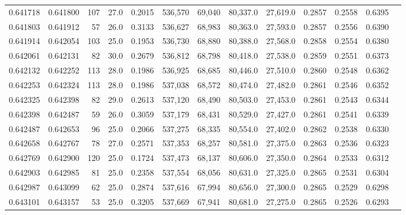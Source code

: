 \begin{tabular}{rrrrrrrrrrrrr}
0.641718 & 0.641800 &   107 & 27.0 &                                     0.2015 & 536,570 &  69,040 &  80,337.0 &  27,619.0 & 0.2857 & 0.2558 & 0.6395 \\
0.641803 & 0.641912 &    57 & 26.0 &                                     0.3133 & 536,627 &  68,983 &  80,363.0 &  27,593.0 & 0.2857 & 0.2556 & 0.6390 \\
0.641914 & 0.642054 &   103 & 25.0 &                                     0.1953 & 536,730 &  68,880 &  80,388.0 &  27,568.0 & 0.2858 & 0.2554 & 0.6380 \\
0.642061 & 0.642131 &    82 & 30.0 &                                     0.2679 & 536,812 &  68,798 &  80,418.0 &  27,538.0 & 0.2859 & 0.2551 & 0.6373 \\
0.642132 & 0.642252 &   113 & 28.0 &                                     0.1986 & 536,925 &  68,685 &  80,446.0 &  27,510.0 & 0.2860 & 0.2548 & 0.6362 \\
0.642253 & 0.642324 &   113 & 28.0 &                                     0.1986 & 537,038 &  68,572 &  80,474.0 &  27,482.0 & 0.2861 & 0.2546 & 0.6352 \\
0.642325 & 0.642398 &    82 & 29.0 &                                     0.2613 & 537,120 &  68,490 &  80,503.0 &  27,453.0 & 0.2861 & 0.2543 & 0.6344 \\
0.642398 & 0.642487 &    59 & 26.0 &                                     0.3059 & 537,179 &  68,431 &  80,529.0 &  27,427.0 & 0.2861 & 0.2541 & 0.6339 \\
0.642487 & 0.642653 &    96 & 25.0 &                                     0.2066 & 537,275 &  68,335 &  80,554.0 &  27,402.0 & 0.2862 & 0.2538 & 0.6330 \\
0.642658 & 0.642767 &    78 & 27.0 &                                     0.2571 & 537,353 &  68,257 &  80,581.0 &  27,375.0 & 0.2863 & 0.2536 & 0.6323 \\
0.642769 & 0.642900 &   120 & 25.0 &                                     0.1724 & 537,473 &  68,137 &  80,606.0 &  27,350.0 & 0.2864 & 0.2533 & 0.6312 \\
0.642903 & 0.642985 &    81 & 25.0 &                                     0.2358 & 537,554 &  68,056 &  80,631.0 &  27,325.0 & 0.2865 & 0.2531 & 0.6304 \\
0.642987 & 0.643099 &    62 & 25.0 &                                     0.2874 & 537,616 &  67,994 &  80,656.0 &  27,300.0 & 0.2865 & 0.2529 & 0.6298 \\
0.643101 & 0.643157 &    53 & 25.0 &                                     0.3205 & 537,669 &  67,941 &  80,681.0 &  27,275.0 & 0.2865 & 0.2526 & 0.6293 \\

\end{tabular}
